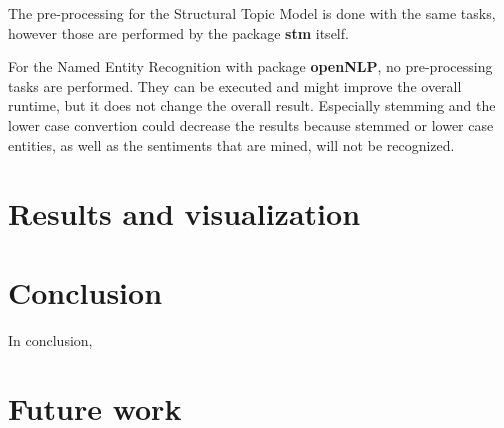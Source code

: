 \documentclass[10pt,a4paper]{article}
\begin{document}
	The pre-processing for the Structural Topic Model is done with the same tasks, however those are performed by the package \textbf{stm} itself.
	
	For the Named Entity Recognition with package \textbf{openNLP}, no pre-processing tasks are performed. They can be executed and might improve the overall runtime, but it does not change the overall result. Especially stemming and the lower case convertion could decrease the results because stemmed or lower case entities, as well as the sentiments that are mined, will not be recognized.

	
	
	\section{Results and visualization}
	
	
	\section{Conclusion}
	In conclusion, 

	\section{Future work}
\end{document}
